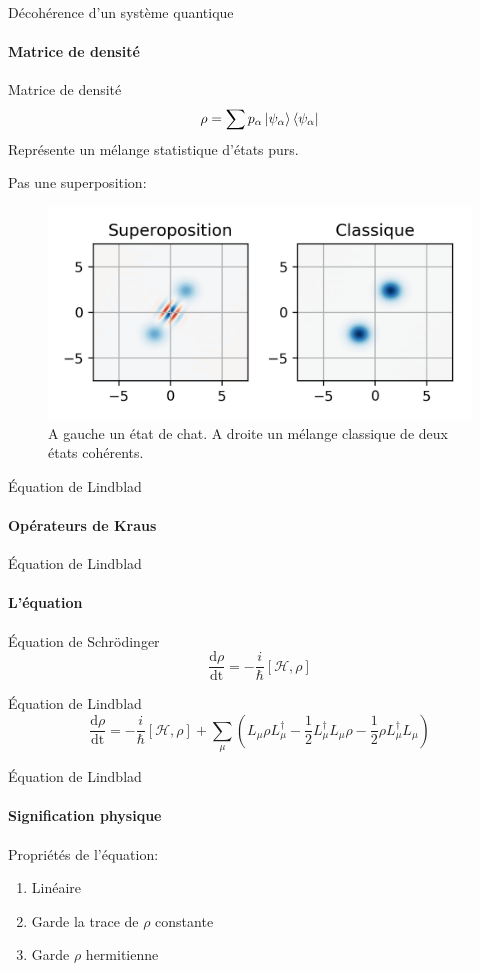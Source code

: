 \documentclass[11pt]{beamer}
\begin{document}
\begin{frame}{Décohérence d'un système quantique}
\framesubtitle{Matrice de densité}
\begin{block}{Matrice de densité}
\[
\rho=\sum p_{\alpha} \ket{\psi_{\alpha}}\bra{\psi_{\alpha}}
\]
Représente un mélange statistique d'états purs.
\end{block}
Pas une superposition:
\begin{figure}
\centering
\includegraphics[width=0.6\linewidth]{pres_wigner_cat_dec}
\caption{A gauche un état de chat. A droite un mélange classique de deux états cohérents.}
\label{fig:preswignercatdec}
\end{figure}
\end{frame}

\begin{frame}{Équation de Lindblad}
\framesubtitle{Opérateurs de Kraus}

\end{frame}

\begin{frame}{Équation de Lindblad}
\framesubtitle{L'équation}
\begin{block}{Équation de Schrödinger}
\[
\frac{\textrm{d}\rho}{\textrm{dt}}=-\frac{i}{\hbar}\left[\mathcal{H},\rho\right]
\]
\end{block}
\begin{block}{Équation de Lindblad}
\[
\frac{\textrm{d}\rho}{\textrm{dt}}=-\frac{i}{\hbar}\left[\mathcal{H},\rho\right]+\sum_{\mu}\left(
	L_{\mu}\rho L_{\mu}^{\dag}-\frac 12 L_{\mu}^{\dag}L_{\mu}\rho -\frac 12 \rho L_{\mu}^{\dag}L_{\mu}
	\right)
\]
\end{block}
\end{frame}

\begin{frame}{Équation de Lindblad}
\framesubtitle{Signification physique}
Propriétés de l'équation:
\begin{enumerate}
\item Linéaire
\item Garde la trace de $\rho$ constante
\item Garde $\rho$ hermitienne

\end{enumerate}
\end{frame}
\end{document}
